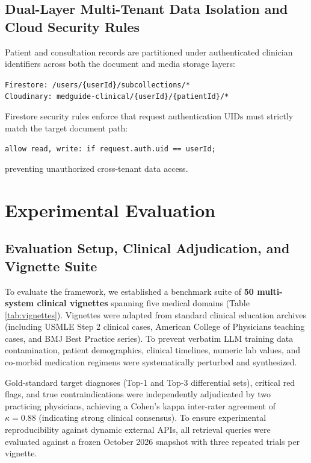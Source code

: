 \documentclass[journal,10pt,twocolumn]{IEEEtran}
\begin{document}
\subsection{Dual-Layer Multi-Tenant Data Isolation and Cloud Security Rules}
Patient and consultation records are partitioned under authenticated clinician identifiers across both the document and media storage layers:
\begin{center}
\small\texttt{Firestore: /users/\{userId\}/subcollections/*}\\
\small\texttt{Cloudinary: medguide-clinical/\{userId\}/\{patientId\}/*}
\end{center}
Firestore security rules enforce that request authentication UIDs must strictly match the target document path:
\begin{center}
\small\texttt{allow read, write: if request.auth.uid == userId;}
\end{center}
preventing unauthorized cross-tenant data access.

\section{Experimental Evaluation}

\subsection{Evaluation Setup, Clinical Adjudication, and Vignette Suite}
To evaluate the framework, we established a benchmark suite of \textbf{50 multi-system clinical vignettes} spanning five medical domains (Table \ref{tab:vignettes}). Vignettes were adapted from standard clinical education archives (including USMLE Step 2 clinical cases, American College of Physicians teaching cases, and BMJ Best Practice series). To prevent verbatim LLM training data contamination, patient demographics, clinical timelines, numeric lab values, and co-morbid medication regimens were systematically perturbed and synthesized.

Gold-standard target diagnoses (Top-1 and Top-3 differential sets), critical red flags, and true contraindications were independently adjudicated by two practicing physicians, achieving a Cohen's kappa inter-rater agreement of $\kappa = 0.88$ (indicating strong clinical consensus). To ensure experimental reproducibility against dynamic external APIs, all retrieval queries were evaluated against a frozen October 2026 snapshot with three repeated trials per vignette.
\end{document}
